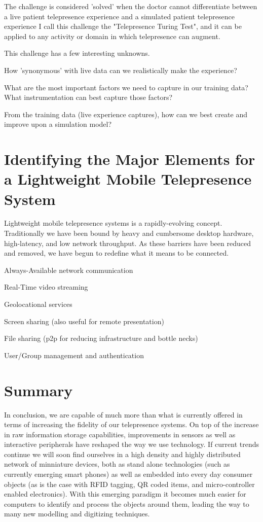 \documentclass[final,a4paper,12pt]{report}
\begin{document}
The challenge is considered 'solved' when the doctor cannot differentiate between a live patient telepresence experience and a simulated patient telepresence experience
I call this challenge the "Telepresence Turing Test", and it can be applied to any activity or domain in which telepresence can augment.

This challenge has a few interesting unknowns.

How 'synonymous' with live data can we realistically make the experience?

What are the most important factors we need to capture in our training data? What instrumentation can best capture those factors?

From the training data (live experience captures), how can we best create and improve upon a simulation model?\cite{391769} 

\section{Identifying the Major Elements for a Lightweight Mobile Telepresence System}

Lightweight mobile telepresence systems is a rapidly-evolving concept. Traditionally we have been bound by heavy and cumbersome desktop hardware, high-latency, and low network throughput. As these barriers have been reduced and removed, we have begun to redefine what it means to be connected.

Always-Available network communication

Real-Time video streaming

Geolocational services

Screen sharing (also useful for remote presentation)

File sharing (p2p for reducing infrastructure and bottle necks)

User/Group management and authentication

\section{Summary}

In conclusion, we are capable of much more than what is currently offered in terms of increasing the fidelity of our telepresence systems. On top of the increase in raw information storage capabilities, improvements in sensors as well as interactive peripherals have reshaped the way we use technology. If current trends continue we will soon find ourselves in a high density and highly distributed network of minniature devices, both as stand alone technologies (such as currently emerging smart phones) as well as embedded into every day consumer objects (as is the case with RFID tagging, QR coded items, and micro-controller enabled electronics). With this emerging paradigm it becomes much easier for computers to identify and process the objects around them, leading the way to many new modelling and digitizing techniques.
\end{document}
